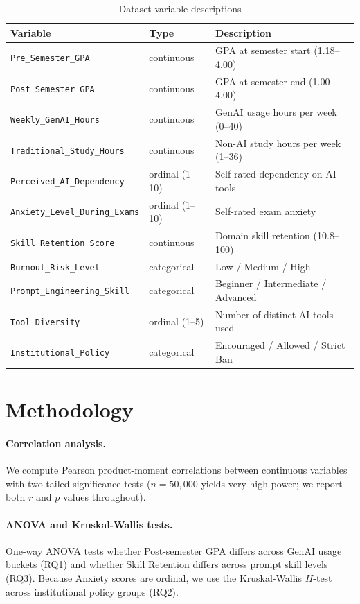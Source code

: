 \documentclass[11pt]{article}
\begin{document}
\begin{table}[htbp]
\centering
\caption{Dataset variable descriptions}
\label{tab:variables}
\begin{tabular}{lll}
\toprule
Variable & Type & Description \\
\midrule
\texttt{Pre\_Semester\_GPA} & continuous & GPA at semester start (1.18--4.00) \\
\texttt{Post\_Semester\_GPA} & continuous & GPA at semester end (1.00--4.00) \\
\texttt{Weekly\_GenAI\_Hours} & continuous & GenAI usage hours per week (0--40) \\
\texttt{Traditional\_Study\_Hours} & continuous & Non-AI study hours per week (1--36) \\
\texttt{Perceived\_AI\_Dependency} & ordinal (1--10) & Self-rated dependency on AI tools \\
\texttt{Anxiety\_Level\_During\_Exams} & ordinal (1--10) & Self-rated exam anxiety \\
\texttt{Skill\_Retention\_Score} & continuous & Domain skill retention (10.8--100) \\
\texttt{Burnout\_Risk\_Level} & categorical & Low / Medium / High \\
\texttt{Prompt\_Engineering\_Skill} & categorical & Beginner / Intermediate / Advanced \\
\texttt{Tool\_Diversity} & ordinal (1--5) & Number of distinct AI tools used \\
\texttt{Institutional\_Policy} & categorical & Encouraged / Allowed / Strict Ban \\
\bottomrule
\end{tabular}
\end{table}

\section{Methodology}
\label{sec:methods}

\paragraph{Correlation analysis.}
We compute Pearson product-moment correlations between continuous variables with
two-tailed significance tests ($n=50{,}000$ yields very high power; we report
both $r$ and $p$ values throughout).

\paragraph{ANOVA and Kruskal-Wallis tests.}
One-way ANOVA tests whether Post-semester GPA differs across GenAI usage
buckets (RQ1) and whether Skill Retention differs across prompt skill levels
(RQ3). Because Anxiety scores are ordinal, we use the Kruskal-Wallis $H$-test
across institutional policy groups (RQ2).
\end{document}
